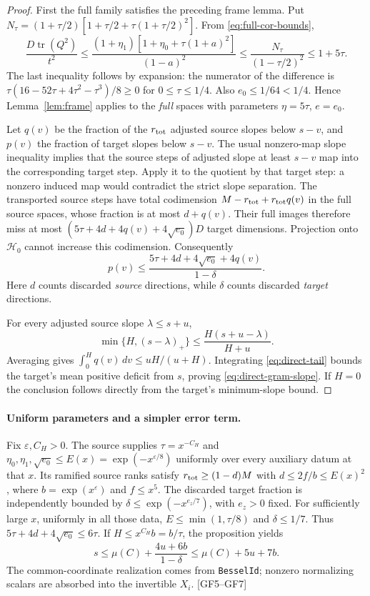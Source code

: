 \documentclass[11pt,a4paper]{article}
\numberwithin{equation}{section}
\theoremstyle{remark}\newtheorem{remark}[theorem]{Remark}
\newcommand{\tr}{\operatorname{tr}}
\begin{document}
\begin{proof}
First the full family satisfies the preceding frame lemma.  Put
$N_\tau=(1+\tau/2)[1+\tau/2+\tau(1+\tau/2)^2]$.  From
\eqref{eq:full-cor-bounds},
\[
\frac{D\tr(Q^2)}{t^2}
\le\frac{(1+\eta_1)[1+\eta_0+\tau(1+a)^2]}{(1-a)^2}
\le\frac{N_\tau}{(1-\tau/2)^2}\le1+5\tau.
\]
The last inequality follows by expansion: the numerator of the difference is
$\tau(16-52\tau+4\tau^2-\tau^3)/8\ge0$ for $0\le\tau\le1/4$.
Also $e_0\le1/64<1/4$.  Hence Lemma~\ref{lem:frame} applies to the
\emph{full} spaces with parameters $\eta=5\tau$, $e=e_0$.

Let $q(v)$ be the fraction of the $r_{\rm tot}$ adjusted source slopes below $s-v$,
and $p(v)$ the fraction of target slopes below $s-v$.  The usual nonzero-map
slope inequality implies that the source steps of adjusted slope at least
$s-v$ map into the corresponding target step.  Apply it to the quotient
by that target step: a nonzero induced map would contradict the strict
slope separation.  The transported source steps have total codimension
$M-r_{\rm tot}+r_{\rm tot}q(v)$ in the full source spaces, whose fraction is at most $d+q(v)$.
Their full images therefore miss at most
$(5\tau+4d+4q(v)+4\sqrt{e_0})D$ target dimensions.
Projection onto $\mathcal H_0$ cannot increase this codimension.
Consequently
\begin{equation}\label{eq:direct-tail}
p(v)\le\frac{5\tau+4d+4\sqrt{e_0}+4q(v)}{1-\delta}.
\end{equation}
Here $d$ counts discarded \emph{source} directions, while $\delta$ counts
discarded \emph{target} directions.

For every adjusted source slope $\lambda\le s+u$,
\[
\min\{H,(s-\lambda)_+\}
\le\frac{H(s+u-\lambda)}{H+u}.
\]
Averaging gives $\int_0^Hq(v)\,dv\le uH/(u+H)$.
Integrating \eqref{eq:direct-tail} bounds the target's mean positive deficit
from $s$, proving \eqref{eq:direct-gram-slope}.  If $H=0$ the conclusion
follows directly from the target's minimum-slope bound.
\end{proof}

\paragraph{Uniform parameters and a simpler error term.}
Fix $\varepsilon,C_H>0$.  The source supplies $\tau=x^{-C_H}$ and
$\eta_0,\eta_1,\sqrt{e_0}\le E(x)=\exp(-x^{\varepsilon/8})$ uniformly
over every auxiliary datum at that $x$.  Its ramified source ranks satisfy
$r_{\rm tot}\ge(1-d)M$ with $d\le2f/b\le E(x)^2$, where
$b=\exp(x^\varepsilon)$ and $f\le x^5$.
The discarded target fraction is independently bounded by
$\delta\le\exp(-x^{e_z/7})$, with $e_z>0$ fixed.
For sufficiently large $x$, uniformly in all those data,
$E\le\min(1,\tau/8)$ and $\delta\le1/7$.
Thus $5\tau+4d+4\sqrt{e_0}\le6\tau$.
If $H\le x^{C_H}b=b/\tau$, the proposition yields
\begin{equation}\label{eq:direct-frame-final}
s\le\mu(C)+\frac{4u+6b}{1-\delta}
\le\mu(C)+5u+7b.
\end{equation}
The common-coordinate realization comes from \texttt{BesselId}; nonzero
normalizing scalars are absorbed into the invertible $X_i$.
\textsf{[GF5--GF7]}
\end{document}
